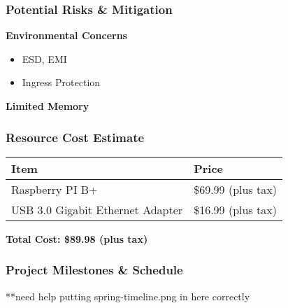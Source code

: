 \begin{frame}
\frametitle{Potential Risks \& Mitigation}


\textbf{Environmental Concerns}
\begin{itemize}
    \item ESD, EMI
    \item Ingress Protection
\end{itemize}
\textbf{Limited Memory}
\end{frame}

\begin{frame}
\frametitle{Resource Cost Estimate}

\begin{center}

\begin{tabular}{l | l}
\toprule
\textbf{Item} & \textbf{Price} \\
\midrule
Raspberry PI B+ & \$69.99 (plus tax) \\
USB 3.0 Gigabit Ethernet Adapter & \$16.99 (plus tax) \\
\bottomrule
\end{tabular}

\hfill \break
\textbf{Total Cost: \$89.98 (plus tax)}
\end{center}


\end{frame}

\begin{frame}
\frametitle{Project Milestones \& Schedule}

**need help putting spring-timeline.png in here correctly

\end{frame}
